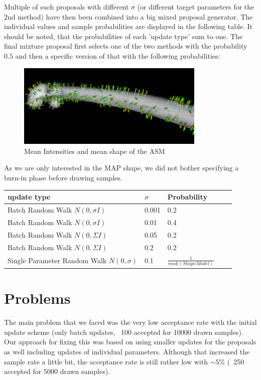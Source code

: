 \documentclass{article}
\begin{document}
	Multiple of such proposals with different $\sigma$ (or different target parameters for the 2nd method) have then been combined into a big mixed proposal generator.
	The individual values and sample probabilities are displayed in the following table.
	It should be noted, that the probabilities of each 'update type' sum to one.
	The final mixture proposal first selects one of the two methods with the probability $0.5$ and then a specific version of that with the following probabilities:
	\begin{figure}
		\centering
			\centering
			\includegraphics[width=0.8\textwidth]{images/mean_pixelintensities.png}
			\caption{Mean Intensities and mean shape of the ASM}
			\label{1.1}
	\end{figure}	
	As we are only interested in the MAP shape, we did not bother specifying a burn-in phase before drawing samples.

	\begin{center}
		\begin{tabular}{l l l l l}
			\toprule
			update type & $\sigma$ & Probability \\
			\midrule
			Batch Random Walk $N(0, \sigma I)$&  0.001 & 	0.2  	\\
			Batch Random Walk $N(0, \sigma I)$& 0.01 & 	0.4 	\\
			Batch Random Walk $N(0, \Sigma I)$& 0.05 &	0.2		\\
			Batch Random Walk $N(0, \Sigma I)$& 0.2&		0.2		\\
			Single Parameter Random Walk $N(0,\sigma)$ & 0.1& $\frac{1}{rank(ShapeModel)}$
		\end{tabular}
	\end{center}
	\section{Problems}
	The main problem that we faced was the very low acceptance rate with the initial update scheme (only batch updates, ~100 accepted for 10000 drawn samples).
	Our approach for fixing this was based on using smaller updates for the proposals as well including updates of individual parameters.
	Although that increased the sample rate a little bit, the acceptance rate is still rather low with $\sim 5\%$ (~250 accepted for 5000 drawn samples).
	
\end{document}
